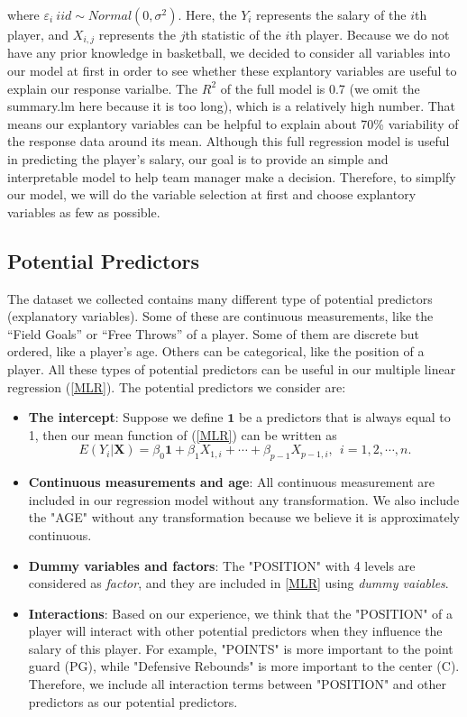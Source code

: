 \documentclass[12pt,]{article}
\begin{document}
where \(\varepsilon_i~iid\sim Normal(0,\sigma^2)\). Here, the \(Y_i\)
represents the salary of the \(i\)th player, and \(X_{i,j}\) represents
the \(j\)th statistic of the \(i\)th player. Because we do not have any
prior knowledge in basketball, we decided to consider all variables into
our model at first in order to see whether these explantory variables
are useful to explain our response varialbe. The \(R^2\) of the full
model is 0.7 (we omit the summary.lm here because it is too long), which
is a relatively high number. That means our explantory variables can be
helpful to explain about 70\% variability of the response data around
its mean. Although this full regression model is useful in predicting
the player's salary, our goal is to provide an simple and interpretable
model to help team manager make a decision. Therefore, to simplfy our
model, we will do the variable selection at first and choose explantory
variables as few as possible.

\subsection{Potential Predictors} \label{PP}

The dataset we collected contains many different type of potential
predictors (explanatory variables). Some of these are continuous
measurements, like the ``Field Goals'' or ``Free Throws'' of a player.
Some of them are discrete but ordered, like a player's age. Others can
be categorical, like the position of a player. All these types of
potential predictors can be useful in our multiple linear regression
(\ref{MLR}). The potential predictors we consider are:

\begin{itemize}
\item \textbf{The intercept}: Suppose we define $\mathbf{1}$ be a predictors that is always equal to 1, then our mean function of (\ref{MLR}) can be written as 
$$ E(Y_{i}|\mathbf{X}) = \beta_0\mathbf{1}+\beta_1X_{1,i}+\cdots+\beta_{p-1}X_{p-1,i},~~i=1,2,\cdots,n.$$
\item \textbf{Continuous measurements and age}: All continuous measurement are included in our regression model without any transformation. We also include the "AGE" without any transformation because we believe it is approximately continuous.

\item \textbf{Dummy variables and factors}: The "POSITION" with 4 levels are considered as \textit{factor}, and they are included in \ref{MLR} using \textit{dummy vaiables}.

\item \textbf{Interactions}: Based on our experience, we think that the "POSITION" of a player will interact with other potential predictors when they influence the salary of this player. For example, "POINTS" is more important to the point guard (PG), while "Defensive Rebounds" is more important to the center (C). Therefore, we include all interaction terms between "POSITION" and other predictors as our potential predictors.
\end{itemize}
\end{document}

